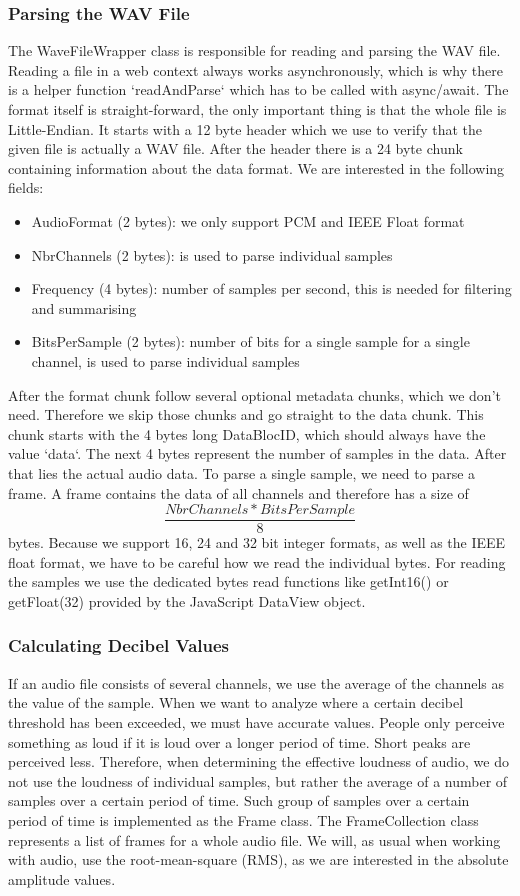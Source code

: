 \subsubsection{Parsing the WAV File}
The WaveFileWrapper class is responsible for reading and parsing the WAV file.
Reading a file in a web context always works asynchronously, which is why there is a helper function `readAndParse` which has to be called with async/await.
The format itself is straight-forward\cite{wav_file_format_wikipedia}, the only important thing is that the whole file is Little-Endian.
It starts with a 12 byte header which we use to verify that the given file is actually a WAV file.
After the header there is a 24 byte chunk containing information about the data format.
We are interested in the following fields:
\begin{itemize}
    \item AudioFormat (2 bytes): we only support PCM and IEEE Float format
    \item NbrChannels (2 bytes): is used to parse individual samples
    \item Frequency (4 bytes): number of samples per second, this is needed for filtering and summarising
    \item BitsPerSample (2 bytes): number of bits for a single sample for a single channel, is used to parse individual samples
\end{itemize}
After the format chunk follow several optional metadata chunks, which we don't need. Therefore we skip those chunks and go straight to the data chunk.
This chunk starts with the 4 bytes long DataBlocID, which should always have the value `data`.
The next 4 bytes represent the number of samples in the data.
After that lies the actual audio data.
To parse a single sample, we need to parse a frame.
A frame contains the data of all channels and therefore has a size of \[\frac{NbrChannels * BitsPerSample}{8}\] bytes.
Because we support 16, 24 and 32 bit integer formats, as well as the IEEE float format, we have to be careful how we read the individual bytes. 
For reading the samples we use the dedicated bytes read functions like getInt16() or getFloat(32) provided by the JavaScript DataView object.

\subsubsection{Calculating Decibel Values}
If an audio file consists of several channels, we use the average of the channels as the value of the sample.
When we want to analyze where a certain decibel threshold has been exceeded, we must have accurate values.
People only perceive something as loud if it is loud over a longer period of time.
Short peaks are perceived less.
Therefore, when determining the effective loudness of audio, we do not use the loudness of individual samples,
but rather the average of a number of samples over a certain period of time.
Such group of samples over a certain period of time is implemented as the Frame class. The FrameCollection class represents
a list of frames for a whole audio file.
We will, as usual when working with audio, use the root-mean-square (RMS), as we are interested in the absolute amplitude values.

